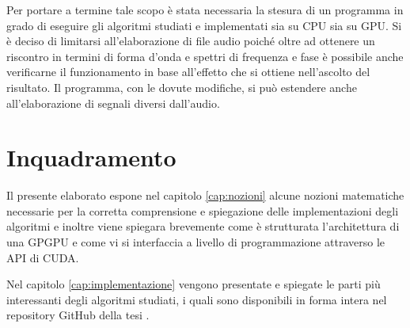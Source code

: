 Per portare a termine tale scopo è stata necessaria la stesura di un programma in grado di eseguire gli algoritmi studiati e implementati sia su CPU sia su GPU. Si è deciso di limitarsi all'elaborazione di file audio poiché oltre ad ottenere un riscontro in termini di forma d'onda e spettri di frequenza e fase è possibile anche verificarne il funzionamento in base all'effetto che si ottiene nell'ascolto del risultato. Il programma, con le dovute modifiche, si può estendere anche all'elaborazione di segnali diversi dall'audio.

\section{Inquadramento}
Il presente elaborato espone nel capitolo \ref{cap:nozioni} alcune nozioni matematiche necessarie per la corretta comprensione e spiegazione delle implementazioni degli algoritmi e inoltre viene spiegara brevemente come è strutturata l'architettura di una GPGPU e come vi si interfaccia a livello di programmazione attraverso le API di CUDA.

Nel capitolo \ref{cap:implementazione} vengono presentate e spiegate le parti più interessanti degli algoritmi studiati, i quali sono disponibili in forma intera nel repository GitHub della tesi \cite{repo}.